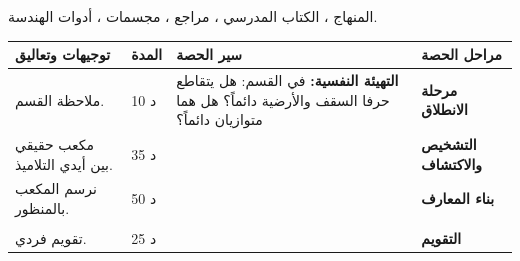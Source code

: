 \documentclass[12pt,a4paper]{article}
\newenvironment{LTR}{\begin{otherlanguage}{english}}{\end{otherlanguage}}
\newcommand{\ar}[1]{\foreignlanguage{arabic}{#1}}
\newcommand{\Phase}[1]{\textbf{#1}}
\newenvironment{Sayr}{%
\begin{LTR}\renewcommand{\arraystretch}{1.25}
\begin{longtable}{|p{0.17\textwidth}|>{\centering\arraybackslash}p{0.06\textwidth}|p{0.53\textwidth}|>{\centering\arraybackslash}p{0.12\textwidth}|}
\hline\rowcolor{cThm!12}\ar{\textbf{توجيهات وتعاليق}} & \ar{\textbf{المدة}} & \ar{\textbf{سير الحصة}} & \ar{\textbf{مراحل الحصة}}\\\hline\endhead
\hline\endfoot}{\end{longtable}\end{LTR}}
\newcommand{\Row}[4]{\ar{\small #4} & \ar{#3} & \ar{#2} & \cellcolor{cThm!8}\ar{\Phase{#1}}\\\hline}
\newcommand{\Lab}[2]{\foreignlanguage{english}{\tcbox[on line,colback=#1,colframe=#1,boxrule=0pt,arc=2pt,boxsep=1pt,left=5pt,right=5pt,top=1pt,bottom=1pt]{\ar{\textcolor{white}{\textbf{#2}}}}}}
\newcommand{\Num}[1]{\foreignlanguage{english}{\tikz[baseline=(c.base)]\node[fill=cDef,text=white,inner sep=2pt,font=\footnotesize\bfseries](c){#1};}}
\newcommand{\ck}{\ensuremath{{\color{cRem}\checkmark}}}
\begin{document}
{المنهاج ، الكتاب المدرسي ، مراجع ، مجسمات ، أدوات الهندسة.}
\begin{Sayr}
\Row{مرحلة الانطلاق}{%
\textbf{التهيئة النفسية:} في القسم: هل يتقاطع حرفا السقف والأرضية دائماً؟ هل هما متوازيان دائماً؟}{10 د}{ملاحظة القسم.}
\Row{التشخيص والاكتشاف}{%
\Lab{cEx}{مناقشة نشاط 05 صفحة 183}\par\ck\ في المكعب $ABCDEFGH$: مستقيمات تتقاطع ، مستقيمات متوازية ، ومستقيمات لا تتقاطع ولا تتوازى.\par
\ck\ $M$ و $L$ منتصفا $[BF]$ و $[CG]$: $BMLC$ مستطيل ، و $ML=BC=10$ cm.\par
}{35 د}{مكعب حقيقي بين أيدي التلاميذ.}
\Row{بناء المعارف}{%
\Lab{cThm}{موضوعات}\par\ck\ نقطتان متمايزتان تعيّنان مستقيماً وحيداً.\par
\ck\ ثلاث نقط ليست على استقامة واحدة تعيّن مستوياً وحيداً.\par
\ck\ إذا شمل مستوٍ نقطتين متمايزتين فإنه يشمل المستقيم الذي يمر بهما.\par
\Lab{cThm}{مستقيمان في الفضاء}\ إما \textbf{من نفس المستوي} (متقاطعان أو متوازيان) ، وإما \textbf{ليسا من نفس المستوي}.\par\smallskip\begin{LTR}\centering\begin{tikzpicture}[scale=0.85,font=\scriptsize]
\coordinate (A) at (0,0); \coordinate (B) at (2,0); \coordinate (C) at (2.9,0.8); \coordinate (D) at (0.9,0.8);
\coordinate (E) at (0,2); \coordinate (F) at (2,2); \coordinate (G) at (2.9,2.8); \coordinate (H) at (0.9,2.8);
\draw[thick] (A)--(B)--(F)--(E)--cycle; \draw[thick] (B)--(C)--(G)--(F); \draw[thick] (E)--(H)--(G);
\draw[dashed] (A)--(D)--(C); \draw[dashed] (D)--(H);
\draw[cThm,thick] (A)--(G);
\foreach \p/\pos in {A/below left,B/below right,C/right,D/left,E/left,F/below right,G/above right,H/above left} \node[\pos] at (\p){$\p$};
\end{tikzpicture}\end{LTR}\par}{50 د}{نرسم المكعب بالمنظور.}
\Row{}{%
\Lab{cEx}{مثال}\ في المكعب: $(AB)\parallel(HG)$ ؛ $(AB)$ و $(BF)$ متقاطعان في $B$ ؛ $(AE)$ و $(BC)$ ليسا من نفس المستوي.\par\Lab{cThm!80!black}{حذار}\ مستقيمان لا يتقاطعان ليسا بالضرورة متوازيين في الفضاء.}{}{}
\Row{التقويم}{%
\Lab{cEx}{تطبيق}\par في المكعب: حدد وضع: \Num{1} $(EF)$ و $(DC)$ ؛ \Num{2} $(AG)$ و $(EC)$ ؛ \Num{3} $(FG)$ و $(AD)$.\par\textbf{الحل:} \Num{1} متوازيان ؛ \Num{2} متقاطعان (قطرا المستطيل $AEGC$) ؛ \Num{3} متوازيان.\par\textbf{واجب منزلي:} تمارين من الكتاب المدرسي.\par\smallskip\textbf{ملاحظات حول سير الحصة:} \dotfill}{25 د}{تقويم فردي.}
\end{Sayr}
\end{document}
